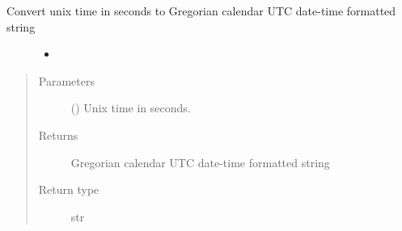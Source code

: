 \documentclass[letterpaper,10pt,english]{sphinxmanual}
\begin{document}
\begin{fulllineitems}
\label{\detokenize{modules/ccsds_write:ccsds_write.unix2datestr}}
Convert unix time in seconds to Gregorian calendar UTC date-time formatted string
\begin{description}
\item[{}] \leavevmode\begin{itemize}
\item {} 
{\hyperref[\detokenize{modules/ccsds_write:ccsds_write.unix2date}]{}}

\end{itemize}

\end{description}
\begin{quote}\begin{description}
\item[{Parameters}] \leavevmode
{} () \textendash{} Unix time in seconds.

\item[{Returns}] \leavevmode
Gregorian calendar UTC date-time formatted string

\item[{Return type}] \leavevmode
str

\end{description}\end{quote}

\end{fulllineitems}

\end{document}
